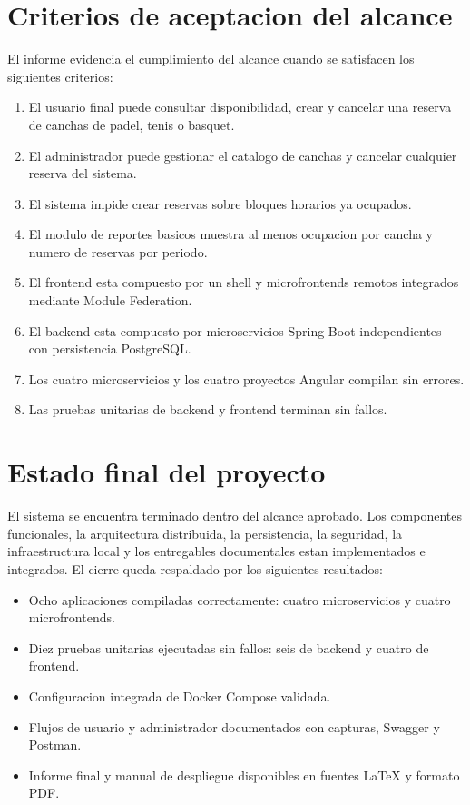 \documentclass[12pt,a4paper]{article}
\begin{document}
\section{Criterios de aceptacion del alcance}

El informe evidencia el cumplimiento del alcance cuando se satisfacen los siguientes criterios:

\begin{enumerate}
  \item El usuario final puede consultar disponibilidad, crear y cancelar una reserva de canchas de padel, tenis o basquet.
  \item El administrador puede gestionar el catalogo de canchas y cancelar cualquier reserva del sistema.
  \item El sistema impide crear reservas sobre bloques horarios ya ocupados.
  \item El modulo de reportes basicos muestra al menos ocupacion por cancha y numero de reservas por periodo.
  \item El frontend esta compuesto por un shell y microfrontends remotos integrados mediante Module Federation.
  \item El backend esta compuesto por microservicios Spring Boot independientes con persistencia PostgreSQL.
  \item Los cuatro microservicios y los cuatro proyectos Angular compilan sin errores.
  \item Las pruebas unitarias de backend y frontend terminan sin fallos.
\end{enumerate}

\section{Estado final del proyecto}

El sistema se encuentra terminado dentro del alcance aprobado. Los componentes funcionales, la arquitectura distribuida, la persistencia, la seguridad, la infraestructura local y los entregables documentales estan implementados e integrados. El cierre queda respaldado por los siguientes resultados:

\begin{itemize}
  \item Ocho aplicaciones compiladas correctamente: cuatro microservicios y cuatro microfrontends.
  \item Diez pruebas unitarias ejecutadas sin fallos: seis de backend y cuatro de frontend.
  \item Configuracion integrada de Docker Compose validada.
  \item Flujos de usuario y administrador documentados con capturas, Swagger y Postman.
  \item Informe final y manual de despliegue disponibles en fuentes LaTeX y formato PDF.
\end{itemize}
\end{document}
